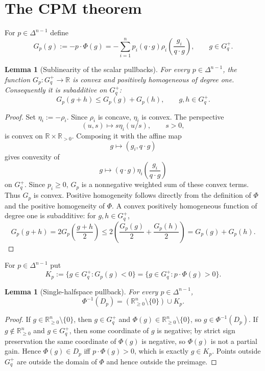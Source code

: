 \documentclass[11pt]{article}
\theoremstyle{plain}
\newtheorem{lemma}[theorem]{Lemma}
\theoremstyle{definition}
\theoremstyle{remark}
\newcommand{\R}{\mathbb{R}}
\newcommand{\DeltaN}{\Delta^{n-1}}
\begin{document}
\section{The CPM theorem}

For $p\in\DeltaN$ define
\[
G_p(g):=-p\cdot\Phi(g)
=-\sum_{i=1}^n p_i(q\cdot g)\rho_i\!\left(\frac{g_i}{q\cdot g}\right),
\qquad g\in G_q^+.
\]

\begin{lemma}[Sublinearity of the scalar pullbacks]
For every $p\in\DeltaN$, the function $G_p:G_q^+\to\R$ is convex and positively homogeneous of degree one. Consequently it is subadditive on $G_q^+$:
\[
G_p(g+h)\le G_p(g)+G_p(h),
\qquad g,h\in G_q^+.
\]
\end{lemma}

\begin{proof}
Set $\eta_i:=-\rho_i$. Since $\rho_i$ is concave, $\eta_i$ is convex. The perspective
\[
(u,s)\longmapsto s\eta_i(u/s),\qquad s>0,
\]
is convex on $\R\times\R_{>0}$. Composing it with the affine map
\[
g\longmapsto (g_i,q\cdot g)
\]
gives convexity of
\[
g\longmapsto (q\cdot g)\eta_i\!\left(\frac{g_i}{q\cdot g}\right)
\]
on $G_q^+$. Since $p_i\ge0$, $G_p$ is a nonnegative weighted sum of these convex terms. Thus $G_p$ is convex. Positive homogeneity follows directly from the definition of $\Phi$ and the positive homogeneity of $\Phi$. A convex positively homogeneous function of degree one is subadditive: for $g,h\in G_q^+$,
\[
G_p(g+h)=2G_p\!\left(\frac{g+h}{2}\right)
\le 2\left(\frac{G_p(g)}{2}+\frac{G_p(h)}{2}\right)
=G_p(g)+G_p(h).
\]
\end{proof}

For $p\in\DeltaN$ put
\[
K_p:=\{g\in G_q^+:G_p(g)<0\}=
\{g\in G_q^+:p\cdot\Phi(g)>0\}.
\]

\begin{lemma}[Single-halfspace pullback]
For every $p\in\DeltaN$,
\[
\Phi^{-1}(D_p)=
(\R^n_{\ge0}\setminus\{0\})\cup K_p.
\]
\end{lemma}

\begin{proof}
If $g\in\R^n_{\ge0}\setminus\{0\}$, then $g\in G_q^+$ and $\Phi(g)\in\R^n_{\ge0}\setminus\{0\}$, so $g\in\Phi^{-1}(D_p)$.
If $g\notin\R^n_{\ge0}$ and $g\in G_q^+$, then some coordinate of $g$ is negative; by strict sign preservation the same coordinate of $\Phi(g)$ is negative, so $\Phi(g)$ is not a partial gain. Hence $\Phi(g)\in D_p$ iff $p\cdot\Phi(g)>0$, which is exactly $g\in K_p$. Points outside $G_q^+$ are outside the domain of $\Phi$ and hence outside the preimage.
\end{proof}
\end{document}
